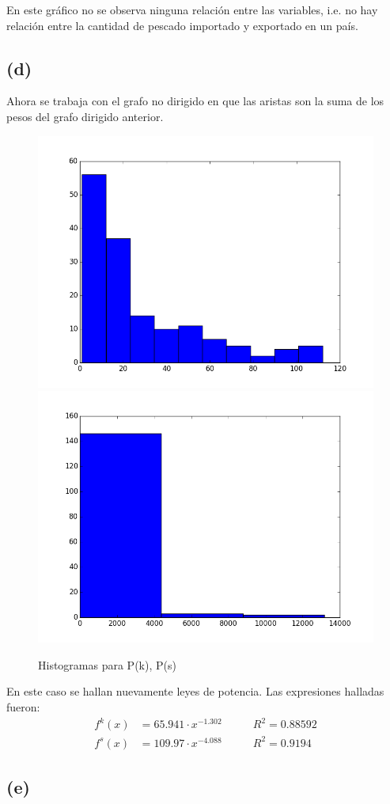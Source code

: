 \documentclass[letterpaper]{article}
\begin{document}
En este gráfico no se observa ninguna relación entre las variables, i.e. no hay relación entre la cantidad de pescado importado y exportado en un país.

\subsection*{(d)}
Ahora se trabaja con el grafo no dirigido en que las aristas son la suma de los pesos del grafo dirigido anterior.
\begin{figure}[H]
  \centering
  \includegraphics[width=.49\linewidth]{img/p9-k.png}\hfill
  \includegraphics[width=.49\linewidth]{img/p9-s.png}\hfill
  \caption{Histogramas para P(k), P(s)}
  \label{chart:3}
\end{figure}
En este caso se hallan nuevamente leyes de potencia. Las expresiones halladas fueron:
\begin{align}
  f^{k}(x)  &= 65.941\cdot x^{-1.302} & \qquad R^2 = 0.88592 \\
  f^{s}(x)  &= 109.97\cdot x^{-4.088}  & \qquad R^2 = 0.9194
\end{align}



\subsection*{(e)}
\end{document}
